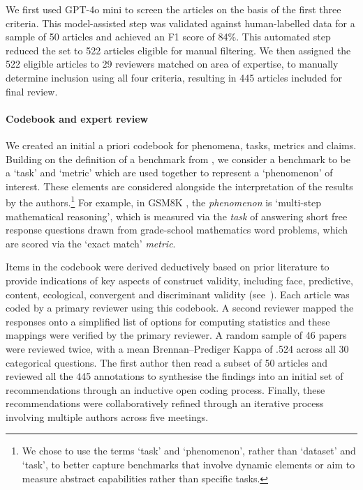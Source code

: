 
We first used GPT-4o mini \cite{gpt-4o-mini} to screen the articles on the basis of the first three criteria.  This model-assisted step was validated against human-labelled data for  a sample of 50 articles and achieved an F1 score of 84\%. This automated step reduced the set to 522 articles eligible for manual filtering. We then assigned the 522 eligible articles to 29 reviewers matched on area of expertise, to manually determine inclusion using all four criteria, resulting in 445 articles included for final review.


\paragraph{Codebook and expert review}\label{codebook}

We created an initial a priori codebook for phenomena, tasks, metrics and claims. Building on the definition of a benchmark from \textcite{rajiAIEverythingWhole2021a}, we consider a benchmark to be a `task' and `metric' which are used together to represent a `phenomenon' of interest. These elements are considered alongside the interpretation of the results by the authors.\footnote{We chose to use the terms `task' and `phenomenon', rather than `dataset' and `task', to better capture benchmarks that involve dynamic elements or aim to measure abstract capabilities rather than specific tasks.} For example, in GSM8K \cite{cobbe_training_2021}, the \textit{phenomenon} is `multi-step mathematical reasoning', which is measured via the \textit{task} of answering short free response questions drawn from grade-school mathematics word problems, which are scored via the `exact match' \textit{metric}.

Items in the codebook were derived deductively based on prior literature to provide indications of key aspects of construct validity, including face, predictive, content, ecological, convergent and discriminant validity (see~). Each article was coded by a primary reviewer using this codebook. A second reviewer mapped the responses onto a simplified list of options for computing statistics and these mappings were verified by the primary reviewer. A random sample of 46 papers were reviewed twice, with a mean Brennan–Prediger Kappa of .524 across all 30 categorical questions.
%
The first author then read a subset of 50 articles and reviewed all the 445 annotations to synthesise the findings into an initial set of recommendations through an inductive open coding process. Finally, these recommendations were collaboratively refined through an iterative process involving multiple authors across five meetings.
